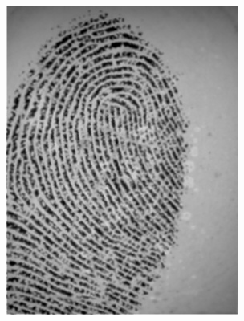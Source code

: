 \documentclass{beamer}
\begin{document}
{\begin{figure}[!ht]
\begin{subfigure}[ht]{0.15\textwidth}
            \includegraphics[width=\textwidth]{fingerprints/2004Db4a/1_2_src.jpg}
        \end{subfigure}
        \qquad
        \begin{subfigure}[ht]{0.15\textwidth}

\end{subfigure}
\end{figure}}
\end{document}
